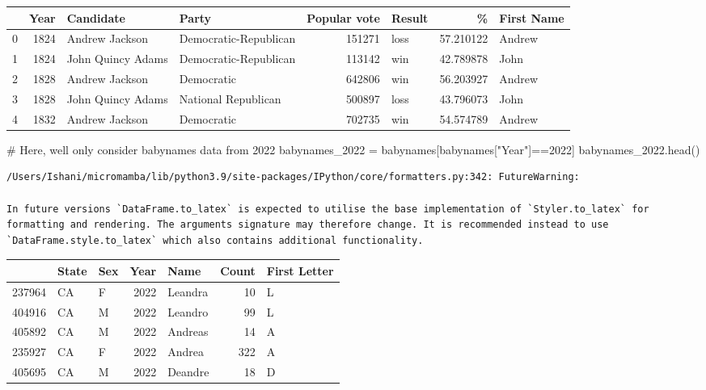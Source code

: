 \documentclass[
  letterpaper,
  DIV=11,
  numbers=noendperiod]{scrreprt}
\newenvironment{Shaded}{\begin{snugshade}}{\end{snugshade}}
\newcommand{\CommentTok}[1]{\textcolor[rgb]{0.37,0.37,0.37}{#1}}
\newcommand{\DecValTok}[1]{\textcolor[rgb]{0.68,0.00,0.00}{#1}}
\newcommand{\NormalTok}[1]{\textcolor[rgb]{0.00,0.23,0.31}{#1}}
\newcommand{\OperatorTok}[1]{\textcolor[rgb]{0.37,0.37,0.37}{#1}}
\newcommand{\StringTok}[1]{\textcolor[rgb]{0.13,0.47,0.30}{#1}}
\begin{document}
\begin{tabular}{lrllrlrl}
\toprule
{} &  Year &          Candidate &                  Party &  Popular vote & Result &          \% & First Name \\
\midrule
0 &  1824 &     Andrew Jackson &  Democratic-Republican &        151271 &   loss &  57.210122 &     Andrew \\
1 &  1824 &  John Quincy Adams &  Democratic-Republican &        113142 &    win &  42.789878 &       John \\
2 &  1828 &     Andrew Jackson &             Democratic &        642806 &    win &  56.203927 &     Andrew \\
3 &  1828 &  John Quincy Adams &    National Republican &        500897 &   loss &  43.796073 &       John \\
4 &  1832 &     Andrew Jackson &             Democratic &        702735 &    win &  54.574789 &     Andrew \\
\bottomrule
\end{tabular}

\begin{Shaded}
\begin{Highlighting}[]
\CommentTok{\# Here, we\textquotesingle{}ll only consider \textasciigrave{}babynames\textasciigrave{} data from 2022}
\NormalTok{babynames\_2022 }\OperatorTok{=}\NormalTok{ babynames[babynames[}\StringTok{"Year"}\NormalTok{]}\OperatorTok{==}\DecValTok{2022}\NormalTok{]}
\NormalTok{babynames\_2022.head()}
\end{Highlighting}
\end{Shaded}

\begin{verbatim}
/Users/Ishani/micromamba/lib/python3.9/site-packages/IPython/core/formatters.py:342: FutureWarning:

In future versions `DataFrame.to_latex` is expected to utilise the base implementation of `Styler.to_latex` for formatting and rendering. The arguments signature may therefore change. It is recommended instead to use `DataFrame.style.to_latex` which also contains additional functionality.
\end{verbatim}

\begin{tabular}{lllrlrl}
\toprule
{} & State & Sex &  Year &     Name &  Count & First Letter \\
\midrule
237964 &    CA &   F &  2022 &  Leandra &     10 &            L \\
404916 &    CA &   M &  2022 &  Leandro &     99 &            L \\
405892 &    CA &   M &  2022 &  Andreas &     14 &            A \\
235927 &    CA &   F &  2022 &   Andrea &    322 &            A \\
405695 &    CA &   M &  2022 &  Deandre &     18 &            D \\
\bottomrule
\end{tabular}
\end{document}
